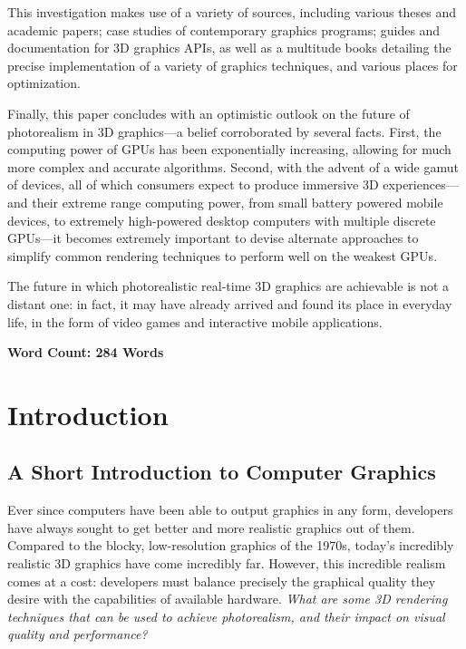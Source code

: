 \documentclass[11pt, oneside]{report}
\begin{document}
This investigation makes use of a variety of sources, including various theses and academic papers; case studies of contemporary graphics programs; guides and documentation for 3D graphics \glspl{API}, as well as a multitude books detailing the precise implementation of a variety of graphics techniques, and various places for optimization.

Finally, this paper concludes with an optimistic outlook on the future of photorealism in 3D graphics—a belief corroborated by several facts. First, the computing power of \glspl{GPU} has been exponentially increasing, allowing for much more complex and accurate algorithms. Second, with the advent of a wide gamut of devices, all of which consumers expect to produce immersive 3D experiences---and their extreme range computing power, from small battery powered mobile devices, to extremely high-powered desktop computers with multiple discrete \glspl{GPU}---it becomes extremely important to devise alternate approaches to simplify common rendering techniques to perform well on the weakest \glspl{GPU}.

The future in which photorealistic real-time 3D graphics are achievable is not a distant one: in fact, it may have already arrived and found its place in everyday life, in the form of video games and interactive mobile applications.

\textbf{Word Count: 284 Words}

\setcounter{tocdepth}{1}
\tableofcontents

\chapter{Introduction}
\section{A Short Introduction to Computer Graphics}
Ever since computers have been able to output graphics in any form, developers have always sought to get better and more realistic graphics out of them. Compared to the blocky, low-resolution graphics of the 1970s, today’s incredibly realistic 3D graphics have come incredibly far. However, this incredible realism comes at a cost: developers must balance precisely the graphical quality they desire with the capabilities of available hardware. \textit{What are some 3D rendering techniques that can be used to achieve photorealism, and their impact on visual quality and performance?}
\end{document}
